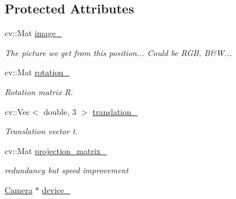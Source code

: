 \subsection*{Protected Attributes}
\begin{DoxyCompactItemize}
\item 
\hypertarget{class_opencv_sf_m_1_1_field_of_view_a7fdf881267569181344ffc63e8558610}{
cv::Mat \hyperlink{class_opencv_sf_m_1_1_field_of_view_a7fdf881267569181344ffc63e8558610}{image\_\-}}
\label{class_opencv_sf_m_1_1_field_of_view_a7fdf881267569181344ffc63e8558610}

\begin{DoxyCompactList}\small\item\em The picture we get from this position... Could be RGB, B\&W... \end{DoxyCompactList}\item 
\hypertarget{class_opencv_sf_m_1_1_field_of_view_af65a2a69ee83e7d380104136b47554ac}{
cv::Mat \hyperlink{class_opencv_sf_m_1_1_field_of_view_af65a2a69ee83e7d380104136b47554ac}{rotation\_\-}}
\label{class_opencv_sf_m_1_1_field_of_view_af65a2a69ee83e7d380104136b47554ac}

\begin{DoxyCompactList}\small\item\em Rotation matrix R. \end{DoxyCompactList}\item 
\hypertarget{class_opencv_sf_m_1_1_field_of_view_a6a5933af068977d707e1823463b4ab05}{
cv::Vec$<$ double, 3 $>$ \hyperlink{class_opencv_sf_m_1_1_field_of_view_a6a5933af068977d707e1823463b4ab05}{translation\_\-}}
\label{class_opencv_sf_m_1_1_field_of_view_a6a5933af068977d707e1823463b4ab05}

\begin{DoxyCompactList}\small\item\em Translation vector t. \end{DoxyCompactList}\item 
\hypertarget{class_opencv_sf_m_1_1_field_of_view_a77a3658e69d8abc43ef22ec9f8b6df5a}{
cv::Mat \hyperlink{class_opencv_sf_m_1_1_field_of_view_a77a3658e69d8abc43ef22ec9f8b6df5a}{projection\_\-matrix\_\-}}
\label{class_opencv_sf_m_1_1_field_of_view_a77a3658e69d8abc43ef22ec9f8b6df5a}

\begin{DoxyCompactList}\small\item\em redundancy but speed improvement \end{DoxyCompactList}\item 
\hypertarget{class_opencv_sf_m_1_1_field_of_view_ae01ec341458e4170e918676cea8d1fd3}{
\hyperlink{class_opencv_sf_m_1_1_camera}{Camera} $\ast$ \hyperlink{class_opencv_sf_m_1_1_field_of_view_ae01ec341458e4170e918676cea8d1fd3}{device\_\-}}
\label{class_opencv_sf_m_1_1_field_of_view_ae01ec341458e4170e918676cea8d1fd3}


\end{DoxyCompactItemize}
